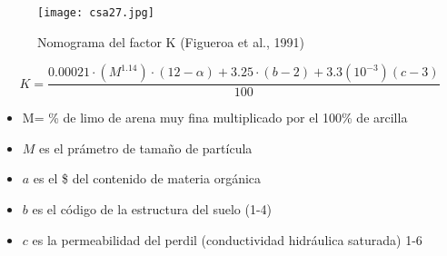     \begin{figure}[h!]
    \centering
      \texttt{[image: csa27.jpg]}
      \caption{ Nomograma del factor K (Figueroa et al., 1991)}
      \label{csa27}
    \end{figure}
    \begin{equation}
        K = \frac{0.00021 \cdot \left(M^{1.14}\right) \cdot \left(12 -\alpha\right) + 3.25\cdot \left(b - 2\right) + 3.3\left(10^{ -3}\right)\left(c- 3\right)}{100}
    \end{equation}
    \begin{notation}
        \begin{itemize}
            \item M= \% de limo de arena muy fina multiplicado por el 100\% de arcilla
            \item $M$ es el prámetro de tamaño de partícula
            \item $a$ es el \$ del contenido de materia orgánica
            \item $b$ es el código de la estructura del suelo (1-4)
            \item $c$ es la permeabilidad del perdil (conductividad hidráulica saturada) 1-6
        \end{itemize}
    \end{notation}
